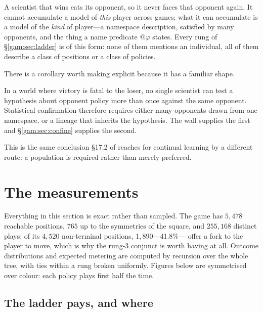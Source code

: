 A scientist that wins eats its opponent, so it never faces that opponent again.
It cannot accumulate a model of \emph{this} player across games; what it can
accumulate is a model of the \emph{kind} of player---a namespace description,
satisfied by many opponents, and the thing a name predicate $@\varphi$ states.
Every rung of \S\ref{gam:sec:ladder} is of this form: none of them mentions an
individual, all of them describe a class of positions or a class of policies.

There is a corollary worth making explicit because it has a familiar shape.

\begin{proposition}\label{gam:learning-requires-population}
In a world where victory is fatal to the loser, no single scientist can test a
hypothesis about opponent policy more than once against the same opponent.
Statistical confirmation therefore requires either many opponents drawn from one
namespace, or a lineage that inherits the hypothesis. The wall supplies the
first and \S\ref{gam:sec:confine} supplies the second.
\end{proposition}

This is the same conclusion \S17.2 of \chSci reaches for continual
learning by a different route: a population is required rather than merely
preferred.

\section{The measurements}\label{gam:sec:measure}\label{gam:S8}

Everything in this section is exact rather than sampled. The game has $5{,}478$
reachable positions, $765$ up to the symmetries of the square, and $255{,}168$
distinct plays; of its $4{,}520$ non-terminal positions, $1{,}890$---$41.8\%$---
offer a fork to the player to move, which is why the rung-3 conjunct is worth
having at all. Outcome distributions and expected metering are computed by
recursion over the whole tree, with ties within a rung broken uniformly.
Figures below are symmetrised over colour: each policy plays first half the
time.

\subsection{The ladder pays, and where}\label{gam:S8.1}

